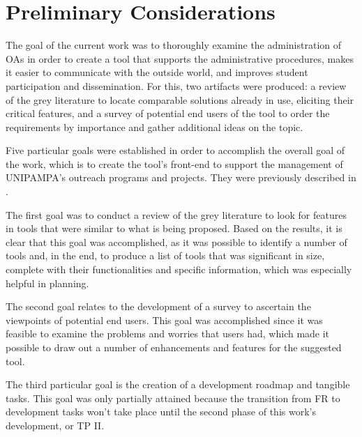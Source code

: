 \chapter{Preliminary Considerations}\label{conclusao}



The goal of the current work was to thoroughly examine the administration of \aclp{OA} in order to create a tool that supports the administrative procedures, makes it easier to communicate with the outside world, and improves student participation and dissemination. For this, two artifacts were produced: a review of the grey literature to locate comparable solutions already in use, eliciting their critical features, and a survey of potential end users of the tool to order the requirements by importance and gather additional ideas on the topic.

Five particular goals were established in order to accomplish the overall goal of the work, which is to create the tool's front-end to support the management of \ac{UNIPAMPA}'s outreach programs and projects. They were previously described in .

The first goal was to conduct a review of the grey literature to look for features in tools that were similar to what is being proposed. Based on the results, it is clear that this goal was accomplished, as it was possible to identify a number of tools and, in the end, to produce a list of tools that was significant in size, complete with their functionalities and specific information, which was especially helpful in planning.

The second goal relates to the development of a survey to ascertain the viewpoints of potential end users. This goal was accomplished since it was feasible to examine the problems and worries that users had, which made it possible to draw out a number of enhancements and features for the suggested tool.

The third particular goal is the creation of a development roadmap and tangible tasks. This goal was only partially attained because the transition from \ac{FR} to development tasks won't take place until the second phase of this work's development, or \ac{TP} II.

